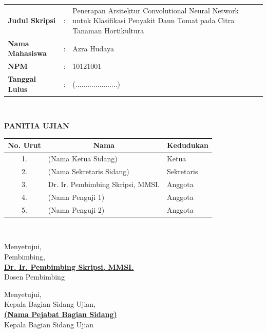 \documentclass[12pt,a4paper,oneside]{report}
\begin{document}
\noindent
\begin{tabular}{p{3.2cm}cp{10.5cm}}
  \textbf{Judul Skripsi} & : & Penerapan Arsitektur Convolutional Neural Network untuk Klasifikasi Penyakit Daun Tomat pada Citra Tanaman Hortikultura \\
  \textbf{Nama Mahasiswa} & : & Azra Hudaya \\
  \textbf{NPM} & : & 10121001 \\
  \textbf{Tanggal Lulus} & : & (.....................)
\end{tabular}\\[0.8cm]

\begin{center}
  {\fontsize{12}{14}\bfseries PANITIA UJIAN}\\[0.3cm]
  \begin{tabular}{|c|p{8.5cm}|p{3.5cm}|}
    \hline
    \textbf{No. Urut} & \multicolumn{1}{c|}{\textbf{Nama}} & \multicolumn{1}{c|}{\textbf{Kedudukan}} \\
    \hline
    1. & (Nama Ketua Sidang) & Ketua \\
    \hline
    2. & (Nama Sekretaris Sidang) & Sekretaris \\
    \hline
    3. & Dr. Ir. Pembimbing Skripsi, MMSI. & Anggota \\
    \hline
    4. & (Nama Penguji 1) & Anggota \\
    \hline
    5. & (Nama Penguji 2) & Anggota \\
    \hline
  \end{tabular}
\end{center}\\[1cm]

\noindent
\begin{minipage}[t]{0.48\textwidth}
  \begin{center}
    Menyetujui,\\
    Pembimbing,\\[2.2cm]
    \underline{\textbf{Dr. Ir. Pembimbing Skripsi, MMSI.}}\\
    Dosen Pembimbing
  \end{center}
\end{minipage}
\hfill
\begin{minipage}[t]{0.48\textwidth}
  \begin{center}
    Menyetujui,\\
    Kepala Bagian Sidang Ujian,\\[2.2cm]
    \underline{\textbf{(Nama Pejabat Bagian Sidang)}}\\
    Kepala Bagian Sidang Ujian
  \end{center}
\end{minipage}
\newpage
\end{document}
